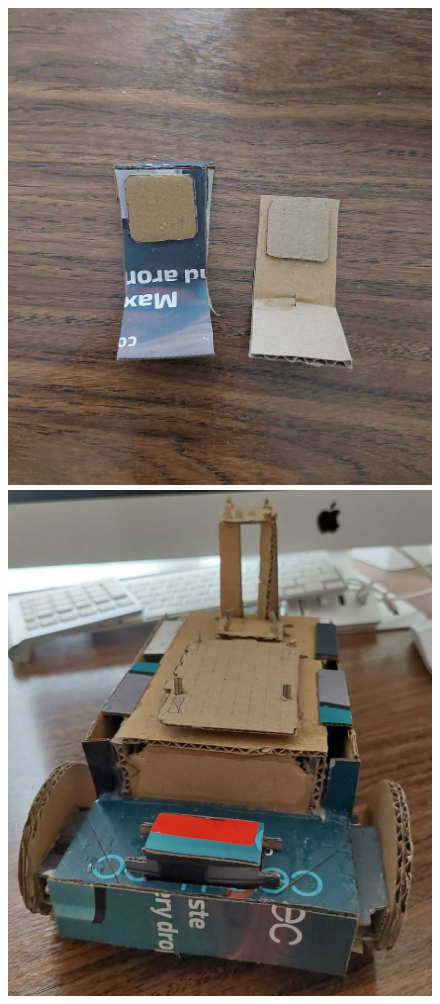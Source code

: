 \begin{figure}[ht!]
	\centering
	\begin{minipage}{0.44\linewidth}
		\centering
		\includegraphics[width=\linewidth]{figs/cap5/boceto_carton4.jpeg}
		\caption*{\centering}
	\end{minipage}
	\hspace{2cm}
	\begin{minipage}{0.4\linewidth}
		\centering
		\includegraphics[width=\linewidth]{figs/cap5/boceto_carton5.jpeg}

\end{minipage}
\end{figure}
